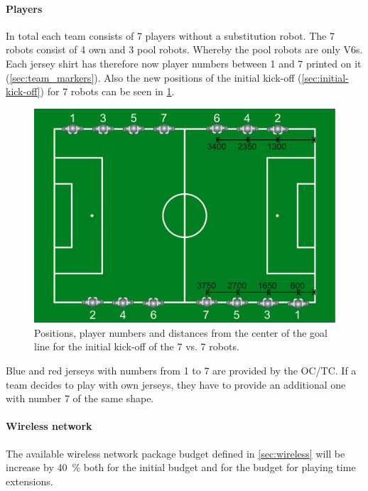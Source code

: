         \paragraph{Players}
            In total each team consists of 7 players without a substitution robot. The 7 robots consist of 4 own and 3 pool robots. Whereby the pool robots are only V6s. Each jersey shirt has therefore now player numbers between 1 and 7 printed on it (\cf \cref{sec:team_markers}). Also the new positions of the initial kick-off (\cf \cref{sec:initial-kick-off}) for 7 robots can be seen in \cref{fig:initial_positions_7vs7}.
            \begin{figure}[t!]
            	\begin{center}
            		\leavevmode
            		\includegraphics[width=1\columnwidth]{figs/initial_positions_7vs7.pdf}
            		\caption{Positions, player numbers and distances from the center of the goal line for the initial kick-off of the 7 vs. 7 robots.}
            		\label{fig:initial_positions_7vs7}
            	\end{center}
            \end{figure}
            Blue and red jerseys with numbers from 1 to 7 are provided by the OC/TC. If a team decides to play with own jerseys, they have to provide an additional one with number 7 of the same shape. 

        \paragraph{Wireless network}
            The available wireless network package budget defined in \cref{sec:wireless} will be increase by \qty{40}{\percent} both for the initial budget and for the budget for playing time extensions.  

